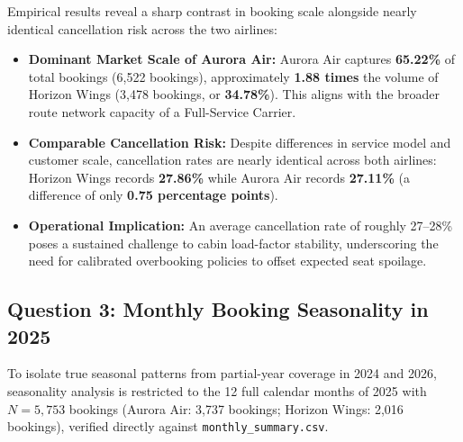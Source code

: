 \documentclass[12pt, a4paper]{report}
\newcommand{\code}[1]{\texttt{\small\color{DarkSlate}#1}}
\newcommand{\pct}[1]{\textbf{#1\%}}
\begin{document}
Empirical results reveal a sharp contrast in booking scale alongside nearly identical cancellation risk across the two airlines:
\begin{itemize}
  \item \textbf{Dominant Market Scale of Aurora Air:} Aurora Air captures \pct{65.22} of total bookings (6,522 bookings), approximately \textbf{1.88 times} the volume of Horizon Wings (3,478 bookings, or \pct{34.78}). This aligns with the broader route network capacity of a Full-Service Carrier.
  \item \textbf{Comparable Cancellation Risk:} Despite differences in service model and customer scale, cancellation rates are nearly identical across both airlines: Horizon Wings records \pct{27.86} while Aurora Air records \pct{27.11} (a difference of only \textbf{0.75 percentage points}).
  \item \textbf{Operational Implication:} An average cancellation rate of roughly 27--28\% poses a sustained challenge to cabin load-factor stability, underscoring the need for calibrated overbooking policies to offset expected seat spoilage.
\end{itemize}

\subsection{Question 3: Monthly Booking Seasonality in 2025}

To isolate true seasonal patterns from partial-year coverage in 2024 and 2026, seasonality analysis is restricted to the 12 full calendar months of 2025 with $N = 5,753$ bookings (Aurora Air: 3,737 bookings; Horizon Wings: 2,016 bookings), verified directly against \code{monthly\_summary.csv}.
\end{document}
